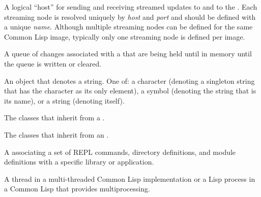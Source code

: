 \begin{glossary-list}
%
%
%
A logical ``host'' for sending and receiving streamed updates to
 and to the .  Each
streaming node is resolved uniquely by \textit{host\/} and \textit{port\/} and
should be defined with a unique \textit{name\/}. Although multiple streaming
nodes can be defined for the same Common Lisp image, typically only one
streaming node is defined per image.


%
%
A  queue of changes associated with a 
that are being held until in memory until the queue is written or cleared.


%
%
An object that denotes a string. One of: a character (denoting a
singleton string that has the character as its only element), a symbol
(denoting the string that is its name), or a string (denoting itself).


\glent[subclasses]
%
%
%
The classes that inherit from a .


\glent[subevents]
%
%
The classes that inherit from an .


%
%
A  associating a set of REPL commands, directory
definitions, and module definitions with a specific library or application.


\glent[thread] 
%
%
%
A thread in a multi-threaded Common Lisp implementation or a Lisp process in a
Common Lisp that provides multiprocessing.



\end{glossary-list}
